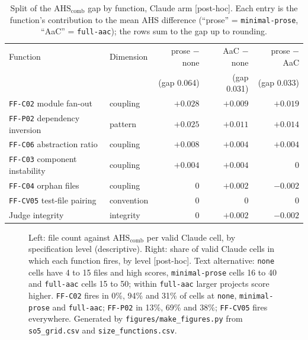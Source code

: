 \documentclass[10pt,a4paper]{article}
\newcommand{\ph}{\textsf{\scriptsize[post-hoc]}}    %
\newcommand{\ff}[1]{\texttt{\small #1}}
\newcommand{\lev}[1]{\texttt{\small #1}}
\newcommand{\AHSc}{\mathrm{AHS}_{\mathrm{comb}}}
\begin{document}
\begin{table}[t]
\centering\small
\caption{Split of the $\AHSc$ gap by function, Claude arm \ph{}. Each entry is the function's contribution to the
mean AHS difference (``prose'' = \lev{minimal-prose}, ``AaC'' = \lev{full-aac}); the rows sum to the gap up to rounding.}
\label{tab:decomp}
\begin{tabular}{@{}llrrr@{}}
\toprule
Function & Dimension & prose $-$ none & AaC $-$ none & prose $-$ AaC \\
 & & (gap 0.064) & (gap 0.031) & (gap 0.033) \\
\midrule
\ff{FF-C02} module fan-out          & coupling   & $+0.028$ & $+0.009$ & $+0.019$ \\
\ff{FF-P02} dependency inversion    & pattern    & $+0.025$ & $+0.011$ & $+0.014$ \\
\ff{FF-C06} abstraction ratio       & coupling   & $+0.008$ & $+0.004$ & $+0.004$ \\
\ff{FF-C03} component instability   & coupling   & $+0.004$ & $+0.004$ & $0$ \\
\ff{FF-C04} orphan files            & coupling   & $0$      & $+0.002$ & $-0.002$ \\
\ff{FF-CV05} test-file pairing      & convention & $0$      & $0$      & $0$ \\
Judge integrity                     & integrity  & $0$      & $+0.002$ & $-0.002$ \\
\bottomrule
\end{tabular}
\end{table}

\begin{figure}[t]
\centering
\begin{minipage}[t]{0.49\linewidth}\centering

\end{minipage}\hfill
\begin{minipage}[t]{0.49\linewidth}\centering

\end{minipage}
\caption{Left: file count against $\AHSc$ per valid Claude cell, by specification level (descriptive). Right: share
of valid Claude cells in which each function fires, by level \ph{}. Text alternative: \lev{none} cells have 4 to
15 files and high scores, \lev{minimal-prose} cells 16 to 40 and \lev{full-aac} cells 15 to 50; within
\lev{full-aac} larger projects score higher. \ff{FF-C02} fires in 0\%, 94\% and 31\% of cells at \lev{none},
\lev{minimal-prose} and \lev{full-aac}; \ff{FF-P02} in 13\%, 69\% and 38\%; \ff{FF-CV05} fires everywhere.
Generated by \texttt{figures/make\_figures.py} from \texttt{so5\_grid.csv} and \texttt{size\_functions.csv}.}
\label{fig:files}\label{fig:firing}
\end{figure}
\end{document}
